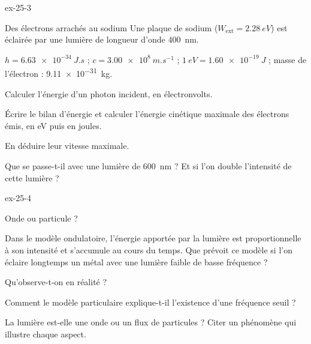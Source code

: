 \begin{blocLivre}{ex-25-3}
\begin{exercice}[1]{Des électrons arrachés au sodium}
Une plaque de sodium ($W_\mathrm{ext}=\qty{2,28}{eV}$) est éclairée par une lumière de longueur d'onde \qty{400}{nm}.
\begin{donnees}
$h=\qty{6,63e-34}{J.s}$ ; $c=\qty{3,00e8}{m.s^{-1}}$ ; $\qty{1}{eV}=\qty{1,60e-19}{J}$ ; masse de l'électron : \qty{9,11e-31}{kg}.
\end{donnees}
\begin{questions}
\item Calculer l'énergie d'un photon incident, en électronvolts.
\item Écrire le bilan d'énergie et calculer l'énergie cinétique maximale des électrons émis, en eV puis en joules.
\item En déduire leur vitesse maximale.
\item Que se passe-t-il avec une lumière de \qty{600}{nm} ? Et si l'on double l'intensité de cette lumière ?
\end{questions}
\end{exercice}
\end{blocLivre}
\begin{blocLivre}{ex-25-4}
\begin{exercice}[1]{Onde ou particule ?}
\begin{questions}
\item Dans le modèle ondulatoire, l'énergie apportée par la lumière est proportionnelle à son intensité et s'accumule au
cours du temps. Que prévoit ce modèle si l'on éclaire longtemps un métal avec une lumière faible de basse fréquence ?
\item Qu'observe-t-on en réalité ?
\item Comment le modèle particulaire explique-t-il l'existence d'une fréquence seuil ?
\item La lumière est-elle une onde ou un flux de particules ? Citer un phénomène qui illustre chaque aspect.
\end{questions}
\end{exercice}
\end{blocLivre}
